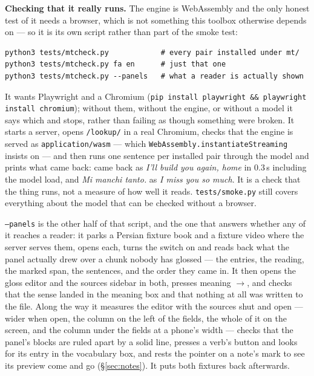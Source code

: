 \documentclass[11pt,oneside]{report}
\newcommand{\pw}[1]{\babelsublr{\mbox{\foreignlanguage{persian}{#1}}}}
\newcommand{\iw}[1]{\foreignlanguage{italian}{\emph{#1}}}
\newcommand{\file}[1]{\texttt{#1}}
\newcommand{\menu}[1]{\textsf{#1}}
\begin{document}
\textbf{Checking that it really runs.} The engine is WebAssembly and the only
honest test of it needs a browser, which is not something this toolbox
otherwise depends on --- so it is its own script rather than part of the
smoke test:

\begin{lstlisting}
python3 tests/mtcheck.py            # every pair installed under mt/
python3 tests/mtcheck.py fa en      # just that one
python3 tests/mtcheck.py --panels   # what a reader is actually shown
\end{lstlisting}

\noindent It wants Playwright and a Chromium
(\texttt{pip install playwright \&\& playwright install chromium}); without
them, without the engine, or without a model it says which and stops, rather
than failing as though something were broken. It starts a server, opens
\texttt{/lookup/} in a real Chromium, checks that the engine is served as
\texttt{application/wasm} --- which \texttt{WebAssembly.instantiate\-Streaming}
insists on --- and then runs one sentence per installed pair through the
model and prints what came back: \pw{دوباره می‌سازمت، وطن} came back as
\emph{I'll build you again, home} in 0.3\,s including the model load, and
\iw{Mi manchi tanto.} as \emph{I miss you so much}. It is a check that the
thing runs, not a measure of how well it reads.
\file{tests/smoke.py} still covers everything about the model that can be
checked without a browser.

\texttt{--panels} is the other half of that script, and the one that answers
whether any of it reaches a reader: it parks a Persian fixture book and a
fixture video where the server serves them, opens each, turns the switch on
and reads back what the panel actually drew over a chunk nobody has
glossed --- the entries, the reading, the marked span, the sentences, and the
order they came in. It then opens the gloss editor and the \menu{sources}
sidebar in both, presses \menu{meaning $\rightarrow$}, and checks that the
sense landed in the meaning box and that nothing at all was written to the
file. Along the way it measures the editor with the sources shut and open ---
wider when open, the column on the left of the fields, the whole of it on the
screen, and the column under the fields at a phone's width --- checks that
the panel's blocks are ruled apart by a solid line, presses a verb's button
and looks for its entry in the vocabulary box, and rests the pointer on a
note's mark to see its preview come and go (\S\ref{sec:notes}). It puts both
fixtures back afterwards.
\end{document}
